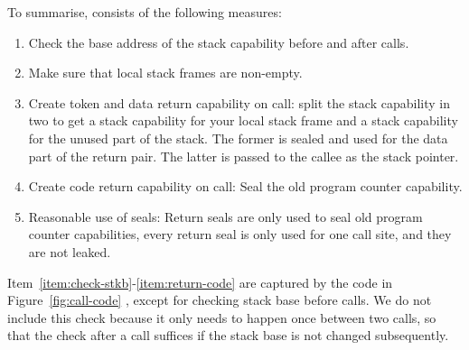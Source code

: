 \documentclass{jfp}
\begin{document}
To summarise, \stktokens{} consists of the following measures:
\begin{enumerate}
\item \label{item:check-stkb} Check the base address of the stack capability before and after calls.
\item \label{item:non-empty-sf} Make sure that local stack frames are non-empty.
\item \label{item:return-data} Create token and data return capability on call: split the stack capability in two to get a stack capability for your local stack frame and a stack capability for the unused part of the stack. The former is sealed and used for the data part of the return pair. The latter is passed to the callee as the stack pointer.
\item \label{item:return-code} Create code return capability on call: Seal the old program counter capability.
\item Reasonable use of seals: Return seals are only used to seal old program counter capabilities, every return seal is only used for one call site, and they are not leaked.
\end{enumerate}
Item~\ref{item:check-stkb}-\ref{item:return-code} are captured by the code in Figure~\ref{fig:call-code} , except for checking stack base before calls.
We do not include this check because it only needs to happen once between two calls, so that the check after a call suffices if the stack base is not changed subsequently.
\end{document}
